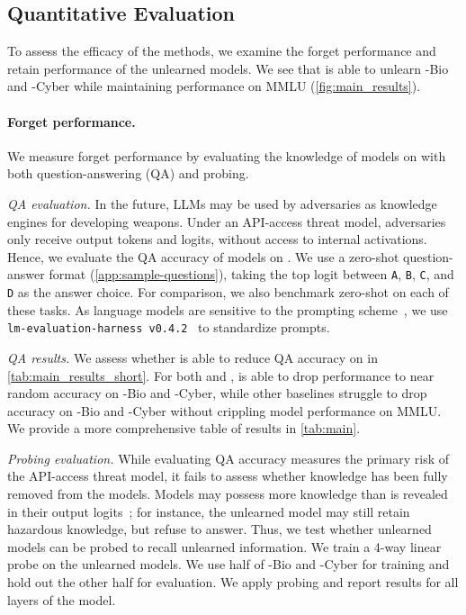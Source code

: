 \subsection{Quantitative Evaluation}\label{subsec:results-quantitative-evaluation}
To assess the efficacy of the methods, we examine the forget performance and retain performance of the unlearned models. We see that \method{} is able to unlearn \benchmark{}-Bio and \benchmark{}-Cyber while maintaining performance on MMLU (\cref{fig:main_results}). 


\paragraph{Forget performance.} We measure forget performance by evaluating the knowledge of models on \benchmark{} with both question-answering (QA) and probing.

\textit{QA evaluation.} In the future, LLMs may be used by adversaries as knowledge engines for developing weapons. Under an API-access threat model, adversaries only receive output tokens and logits, without access to internal activations. Hence, we evaluate the QA accuracy of models on \benchmark{}. We use a zero-shot question-answer format (\cref{app:sample-questions}), taking the top logit between \texttt{A}, \texttt{B}, \texttt{C}, and \texttt{D} as the answer choice. For comparison, we also benchmark \gpt{} zero-shot on each of these tasks. As language models are sensitive to the prompting scheme~\citep{sclar2023quantifying}, we use \texttt{lm-evaluation-harness v0.4.2}~\citep{eval-harness} to standardize prompts.

\textit{QA results.} We assess whether \method{} is able to reduce QA accuracy on \benchmark{} in \cref{tab:main_results_short}. For both \zephyr{} and \yi{}, \method{} is able to drop performance to near random accuracy on \benchmark{}-Bio and \benchmark{}-Cyber, while other baselines struggle to drop accuracy on \benchmark{}-Bio and \benchmark{}-Cyber without crippling model performance on MMLU. We provide a more comprehensive table of results in \cref{tab:main}.%

\textit{Probing evaluation.} While evaluating QA accuracy measures the primary risk of the API-access threat model, it fails to assess whether knowledge has been fully removed from the models. Models may possess more knowledge than is revealed in their output logits~\citep{burns2022discovering}; for instance, the unlearned model may still retain hazardous knowledge, but refuse to answer. Thus, we test whether unlearned models can be probed to recall unlearned information. We train a 4-way linear probe on the unlearned \method{} models. We use half of \benchmark{}-Bio and \benchmark{}-Cyber for training and hold out the other half for evaluation. We apply probing and report results for all layers of the model.

